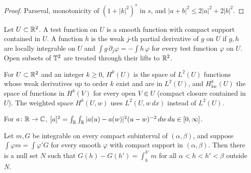 \begin{proof}
\leanok
Parseval, monotonicity of $(1+|k|^2)^s$ in $s$, and
$|a+b|^2\le2|a|^2+2|b|^2$.
\end{proof}

\begin{definition}
\label{def:weak-derivative-local}
\leanok
Let $U\subset\mathbb{R}^2$. A test function on $U$ is a smooth function with compact
support contained in $U$. A function $h$ is the weak $j$-th partial derivative of
$g$ on $U$ if $g,h$ are locally integrable on $U$ and
$\int g\,\partial_j\varphi=-\int h\,\varphi$ for every test function $\varphi$ on $U$.
Open subsets of $\mathbb{T}^2$ are treated through their lifts to $\mathbb{R}^2$.
\end{definition}

\begin{definition}
\label{def:sobolev-local}
\leanok
For $U\subset\mathbb{R}^2$ and an integer $k\ge0$, $H^k(U)$ is the space of $L^2(U)$
functions whose weak derivatives up to order $k$ exist and are in $L^2(U)$, and
$H^k_{\mathrm{loc}}(U)$ the space of functions in $H^k(V)$ for every open
$V\Subset U$ (compact closure contained in $U$). The weighted space
$H^k(U,w)$ uses $L^2(U,w\,dx)$ instead of $L^2(U)$.
\end{definition}

\begin{definition}
\label{def:gagliardo}
\leanok
For $a\colon\mathbb{R}\to\mathbb{C}$,
$[a]^2=\int_{\mathbb{R}}\int_{\mathbb{R}}|a(u)-a(w)|^2(u-w)^{-2}\,dw\,du\in[0,\infty]$.
\end{definition}

\begin{lemma}
\label{lem:du-bois-reymond}
\leanok
Let $m,G$ be integrable on every compact subinterval of $(\alpha,\beta)$, and suppose
$\int\varphi m=\int\varphi'G$ for every smooth $\varphi$ with compact support in
$(\alpha,\beta)$. Then there is a null set $N$ such that $G(h)-G(h')=\int_h^{h'}m$ for all
$\alpha<h<h'<\beta$ outside $N$.
\end{lemma}

